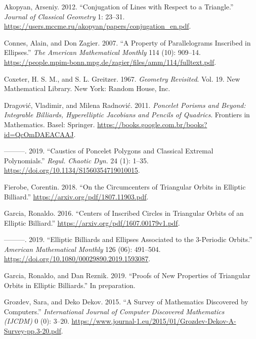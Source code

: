 \documentclass[]{article}
\begin{document}
\hypertarget{refs}{}
\leavevmode\hypertarget{ref-akopyan12}{}%
Akopyan, Arseniy. 2012. ``Conjugation of Lines with Respect to a Triangle.'' \emph{Journal of Classical Geometry} 1: 23--31. \url{https://users.mccme.ru/akopyan/papers/conjugation_en.pdf}.

\leavevmode\hypertarget{ref-connes07}{}%
Connes, Alain, and Don Zagier. 2007. ``A Property of Parallelograms Inscribed in Ellipses.'' \emph{The American Mathematical Monthly} 114 (10): 909--14. \url{https://people.mpim-bonn.mpg.de/zagier/files/amm/114/fulltext.pdf}.

\leavevmode\hypertarget{ref-coxeter67}{}%
Coxeter, H. S. M., and S. L. Greitzer. 1967. \emph{Geometry Revisited}. Vol. 19. New Mathematical Library. New York: Random House, Inc.

\leavevmode\hypertarget{ref-dragovic11}{}%
Dragović, Vladimir, and Milena Radnović. 2011. \emph{Poncelet Porisms and Beyond: Integrable Billiards, Hyperelliptic Jacobians and Pencils of Quadrics}. Frontiers in Mathematics. Basel: Springer. \url{https://books.google.com.br/books?id=QcOmDAEACAAJ}.

\leavevmode\hypertarget{ref-dragovic88}{}%
---------. 2019. ``Caustics of Poncelet Polygons and Classical Extremal Polynomials.'' \emph{Regul. Chaotic Dyn.} 24 (1): 1--35. \url{https://doi.org/10.1134/S1560354719010015}.

\leavevmode\hypertarget{ref-corentin19}{}%
Fierobe, Corentin. 2018. ``On the Circumcenters of Triangular Orbits in Elliptic Billiard.'' \url{https://arxiv.org/pdf/1807.11903.pdf}.

\leavevmode\hypertarget{ref-ronaldo16}{}%
Garcia, Ronaldo. 2016. ``Centers of Inscribed Circles in Triangular Orbits of an Elliptic Billiard.'' \url{https://arxiv.org/pdf/1607.00179v1.pdf}.

\leavevmode\hypertarget{ref-ronaldo19}{}%
---------. 2019. ``Elliptic Billiards and Ellipses Associated to the 3-Periodic Orbits.'' \emph{American Mathematical Monthly} 126 (06): 491--504. \url{https://doi.org/10.1080/00029890.2019.1593087}.

\leavevmode\hypertarget{ref-garcia19a}{}%
Garcia, Ronaldo, and Dan Reznik. 2019. ``Proofs of New Properties of Triangular Orbits in Elliptic Billiards.'' In preparation.

\leavevmode\hypertarget{ref-dekov05}{}%
Grozdev, Sara, and Deko Dekov. 2015. ``A Survey of Mathematics Discovered by Computers.'' \emph{International Journal of Computer Discovered Mathematics (IJCDM)} 0 (0): 3--20. \url{https://www.journal-1.eu/2015/01/Grozdev-Dekov-A-Survey-pp.3-20.pdf}.
\end{document}
